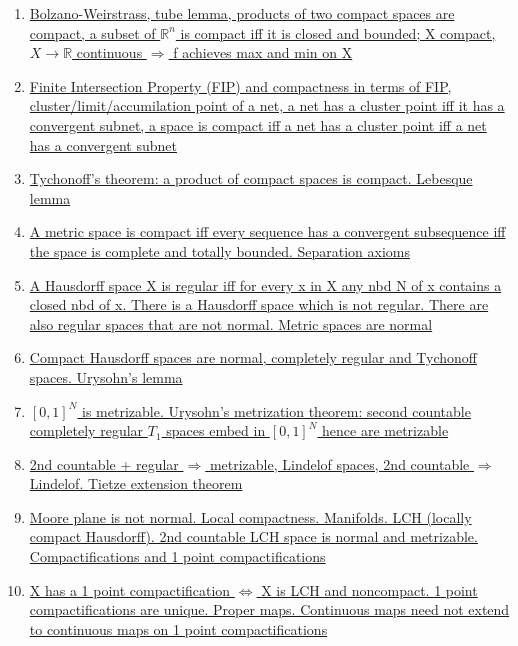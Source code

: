 \documentclass[11pt]{article}
\begin{document}
\begin{enumerate}
	\item \href{https://mp.weixin.qq.com/s/zhIaVKHrCH9sb3EHq0MCOA}{Bolzano-Weirstrass, tube lemma, products of two compact spaces are compact, a subset of $\mathbb{R}^n$ is compact iff it is closed and bounded; X compact, $X \rightarrow \mathbb{R}$ continuous $\Rightarrow$ f achieves max and min on X}	%
	\item \href{https://mp.weixin.qq.com/s/M-0XSv7twgSzrO7hqihwgg}{Finite Intersection Property (FIP) and compactness in terms of FIP, cluster/limit/accumilation point of a net, a net has a cluster point iff it has a convergent subnet, a space is compact iff a net has a cluster point iff a net has a convergent subnet}	%
	\item \href{https://mp.weixin.qq.com/s/cgIR3Q8Z3io88MEpKZGz_w}{Tychonoff's theorem: a product of compact spaces is compact. Lebesque lemma}	%
	\item \href{https://mp.weixin.qq.com/s/GFdQoU1Tv0QZ0xYhm_P43Q}{ A metric space is compact iff every sequence has a convergent subsequence iff the space is complete and totally bounded. Separation axioms}	%
	\item \href{https://mp.weixin.qq.com/s/a8DhbB4Ewouvy2Uw3J9Zhg}{A Hausdorff space X is regular iff for every x in X any nbd N of x contains a closed nbd of x. There is a Hausdorff space which is not regular. There are also regular spaces that are not normal. Metric spaces are normal}	%
	\item \href{https://mp.weixin.qq.com/s/Xi1OTPlVjzUaIFWxSVNnUg}{Compact Hausdorff spaces are normal, completely regular and Tychonoff spaces. Urysohn's lemma}	%
	\item \href{https://mp.weixin.qq.com/s/g4UmuykkDk8i2bJMRb-H2w}{ $[0,1]^{N}$ is metrizable. Urysohn's metrization theorem: second countable completely regular $T_{1}$ spaces embed in $[0,1]^{N}$ hence are metrizable}	%
	\item \href{https://mp.weixin.qq.com/s/EJZkPgmo-UedLEtlPfI_7w}{2nd countable + regular $\Rightarrow$ metrizable, Lindelof spaces, 2nd countable $\Rightarrow$ Lindelof. Tietze extension theorem}	%
	\item \href{https://mp.weixin.qq.com/s/z2LowbgV9tOxOtpFs_gFSg}{Moore plane is not normal. Local compactness. Manifolds. LCH (locally compact Hausdorff). 2nd countable LCH space is normal and metrizable. Compactifications and 1 point compactifications}	%
	\item \href{https://mp.weixin.qq.com/s/4MUD1kGBMEaxR6YNPG7DAg}{X has a 1 point compactification $\Leftrightarrow$ X is LCH and noncompact. 1 point compactifications are unique. Proper maps. Continuous maps need not extend to continuous maps on 1 point compactifications}	%

\end{enumerate}
\end{document}

